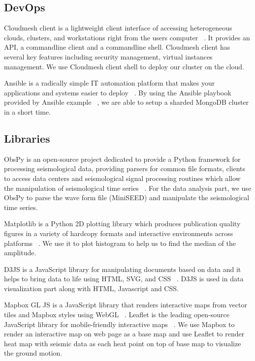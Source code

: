 \documentclass[9pt,twocolumn,twoside]{../../styles/osajnl}
\begin{document}
\subsection{DevOps}

Cloudmesh client is a lightweight client interface of accessing heterogeneous clouds, clusters, and workstations right from the users computer ~\cite{www-cloudmesh}. It provides an API, a commandline client and a commandline shell. Cloudmesh client has several key features including security management, virtual instances management.  We use Cloudmesh client shell to deploy our cluster on the cloud.

Ansible is a radically simple IT automation platform that makes your applications and systems easier to deploy ~\cite{www-ansible}. By using the Ansible playbook provided by Ansible example ~\cite{www-ansimongo}, we are able to setup a sharded MongoDB cluster in a short time.


\subsection{Libraries}

ObsPy is an open-source project dedicated to provide a Python framework for processing seismological data, providing parsers for common file formats, clients to access data centers and seismological signal processing routines which allow the manipulation of seismological time series ~\cite{article-obspy}. For the data analysis part, we use ObsPy to parse the wave form file (MiniSEED) and manipulate the seismological time series.

Matplotlib is a Python 2D plotting library which produces publication quality figures in a variety of hardcopy formats and interactive environments across platforms ~\cite{www-matplot}. We use it to plot histogram to help us to find the median of the amplitude.

D3JS is a JavaScript library for manipulating documents based on data and it helps to bring data to life using HTML, SVG, and CSS ~\cite{www-d3js}. D3JS is used in data visualization part along with HTML, Javascript and CSS.

Mapbox GL JS is a JavaScript library that renders interactive maps from vector tiles and Mapbox styles using WebGL ~\cite{www-mapboxjs}. Leaflet is the leading open-source JavaScript library for mobile-friendly interactive maps ~\cite{www-leaflet}. We use Mapbox to render an interactive map on web page as a base map and use Leaflet to render heat map with seismic data as each heat point on top of base map to visualize the ground motion.
\end{document}
